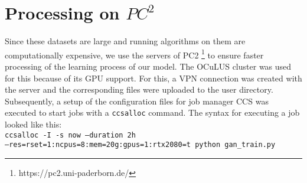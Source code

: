 \section{Processing on $PC^2$}
\label{sec:processing_on_pc2}
%
Since these datasets are large and running algorithms on them are computationally expensive, we use the servers of \ac{PC2} \footnote{https://pc2.uni-paderborn.de/} to ensure faster processing of the learning process of our model.
The OCuLUS cluster was used for this because of its GPU support.
For this, a \ac{VPN} connection was created with the server and the corresponding files were uploaded to the user directory.
Subsequently, a setup of the configuration files for job manager CCS was executed to start jobs with a \texttt{ccsalloc} command.
The syntax for executing a job looked like this:
\\
\texttt{ccsalloc -I -s now --duration 2h }\\ \texttt{--res=rset=1:ncpus=8:mem=20g:gpus=1:rtx2080=t python gan\_train.py}